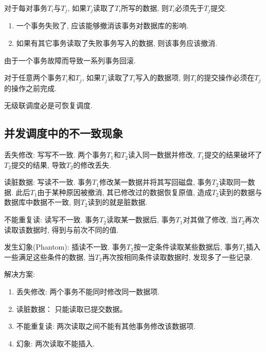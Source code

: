 \begin{definition}[可恢复调度]
  对于每对事务$T_i$与$T_j$, 如果$T_j$读取了$T_i$所写的数据, 则$T_i$必须先于$T_j$提交.
  \begin{enumerate}
      \item 一个事务失败了, 应该能够撤消该事务对数据库的影响.
      \item 如果有其它事务读取了失败事务写入的数据, 则该事务应该撤消.
  \end{enumerate}
\end{definition}

\begin{definition}[级联调度]
  由于一个事务故障而导致一系列事务回滚.
\end{definition}

\begin{definition}[无级连调度]
  对于任意两个事务$T_i$和$T_j$, 如果$T_j$读取了$T_i$写入的数据项, 则$T_i$的提交操作必须在$T_j$的操作之前完成.

  无级联调度必是可恢复调度.
\end{definition}

\subsection{并发调度中的不一致现象}

丢失修改: 写写不一致. 两个事务$T_1$和$T_2$读入同一数据并修改, 
$T_1$提交的结果破坏了$T_2$提交的结果, 导致$T_2$的修改丢失.

读脏数据: 写读不一致. 事务$T_1$修改某一数据并将其写回磁盘, 
事务$T_2$读取同一数据. 
此后$T_1$由于某种原因被撤消, 其已修改过的数据恢复原值, 
造成$T_2$读到的数据与数据库中数据不一致, 则$T_2$读到的就是脏数据.

不能重复读: 读写不一致. 事务$T_2$读取某一数据后, 事务$T_1$对其做了修改, 
当$T_2$再次读取该数据时, 得到与前次不同的值.

发生幻象(Phantom): 插读不一致. 事务$T_2$按一定条件读取某些数据后, 
事务$T_1$插入一些满足这些条件的数据, 
当$T_2$再次按相同条件读取数据时, 发现多了一些记录.

解决方案:
\begin{enumerate}
    \item 丢失修改: 两个事务不能同时修改同一数据项.
    \item 读脏数据： 只能读取已提交数据。
    \item 不能重复读: 两次读取之间不能有其他事务修改该数据项.
    \item 幻象: 两次读取不能插入.
\end{enumerate}

